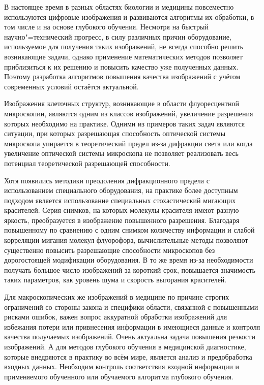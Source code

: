
{\actuality} 

В настоящее время в разных областях биологии и медицины повсеместно используются цифровые изображения и развиваются алгоритмы их обработки, в том числе и на основе глубокого обучения. Несмотря на быстрый научно"=технический прогресс, в силу различных причин оборудование, используемое для получения таких изображений, не всегда способно решить возникающие задачи, однако применение математических методов позволяет приблизиться к их решению и повысить качество уже полученных данных. Поэтому разработка алгоритмов повышения качества изображений с учётом современных условий остаётся актуальной.

Изображения клеточных структур, возникающие в области флуоресцентной микроскопии, являются одним из классов изображений, увеличение разрешения которых необходимо на практике. Одними из примеров таких задач являются ситуации, при которых разрешающая способность оптической системы микроскопа упирается в теоретический предел из-за дифракции света или когда увеличение оптической системы микроскопа не позволяет реализовать весь потенциал теоретической разрешающей способности.

Хотя появились методики преодоления дифракционного предела с использованием специального оборудования, на практике более доступным подходом является использование специальных стохастический мигающих красителей. Серия снимков, на которых молекулы красителя имеют разную яркость, преобразуется в изображение повышенного разрешения. Благодаря повышенному по сравнению с одним снимком количеству информации и слабой корреляции мигания молекул флуорофора, вычислительные методы позволяют существенно повысить разрешающие способности микроскопов без дорогостоящей модификации оборудования. В то же время из-за необходимости получать большое число изображений за короткий срок, повышается значимость таких параметров, как уровень шума и скорость выгорания красителей.

Для макроскопических же изображений в медицине по причине строгих ограничений со стороны закона и специфики области, связанной с повышенными рисками ошибок, важен вопрос аккуратной обработки изображений для избежания потери или привнесения информации в имеющиеся данные и контроля качества получаемых изображений. Очень актуальна задача повышения резкости изображений. А для методов глубокого обучения в медицинской диагностике, которые внедряются в практику во всём мире, является анализ и предобработка входных данных. Необходим контроль соответствия входной информации и применяемого обученного или обучаемого алгоритма глубокого обучения.

